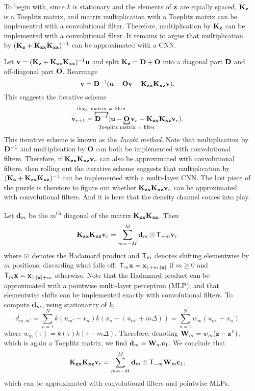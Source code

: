 \documentclass[12pt]{report}
\begin{document}
To begin with, since $k$ is stationary and the elements of $\mathbf{z}$ are equally spaced, $\mathbf{K}_{\mathbf{z}}$ is a Toeplitz matrix, and matrix multiplication with a Toeplitz matrix can be implemented with a convolutional filter.
Therefore, multiplication by $\mathbf{K}_{\mathbf{z}}$ can be implemented with a convolutional filter.
It remains to argue that multiplication by $(\mathbf{K}_{\mathbf{z}} + \mathbf{K}_{\mathbf{z}\mathbf{x}} \mathbf{K}_{\mathbf{x}\mathbf{z}})^{-1}$ can be approximated with a CNN.

Let $\mathbf{v} = (\mathbf{K}_{\mathbf{z}} + \mathbf{K}_{\mathbf{z}\mathbf{x}} \mathbf{K}_{\mathbf{x}\mathbf{z}})^{-1} \mathbf{u}$ and split $\mathbf{K}_{\mathbf{z}} = \mathbf{D} + \mathbf{O}$ into a diagonal part $\mathbf{D}$ and off-diagonal part $\mathbf{O}$.
Rearrange
\begin{equation}
    \mathbf{v} = \mathbf{D}^{-1} (\mathbf{u} - \mathbf{O}\mathbf{v} - \mathbf{K}_{\mathbf{z}\mathbf{x}} \mathbf{K}_{\mathbf{x}\mathbf{z}}\mathbf{v}).
\end{equation}
This suggests the iterative scheme
\begin{equation}
    \vv_{r+1} = \overbracket[1pt]{\mD^{-1}}^{\mathclap{\text{diag.\ matrix $=$ filter}}} (\vu - \underbracket[1pt]{\mO}_{\mathclap{\text{Toeplitz matrix $=$ filter}}} \vv_r - \mK_{\vz\vx} \mK_{\vx\vz}\vv_r).
\end{equation}
This iterative scheme is known as the \emph{Jacobi method}.
Note that multiplication by $\mathbf{D}^{-1}$ and multiplication by $\mathbf{O}$ can both be implemented with convolutional filters.
Therefore, if $\mathbf{K}_{\mathbf{z}\mathbf{x}} \mathbf{K}_{\mathbf{x}\mathbf{z}}\mathbf{v}_r$ can also be approximated with convolutional filters, then rolling out the iterative scheme suggests that multiplication by $(\mathbf{K}_{\mathbf{z}} + \mathbf{K}_{\mathbf{z}\mathbf{x}} \mathbf{K}_{\mathbf{x}\mathbf{z}})^{-1}$ can be implemented with a multi-layer CNN.
The last piece of the puzzle is therefore to figure out whether $\mathbf{K}_{\mathbf{z}\mathbf{x}} \mathbf{K}_{\mathbf{x}\mathbf{z}}\mathbf{v}_r$ can be approximated with convolutional filters.
And it is here that the density channel comes into play.

Let $\mathbf{d}_m$ be the $m$\textsuperscript{th} diagonal of the matrix $\mathbf{K}_{\mathbf{z}\mathbf{x}} \mathbf{K}_{\mathbf{x}\mathbf{z}}$.
Then
\begin{equation}
    \mK_{\vz\vx} \mK_{\vx\vz}\vv_r = \sum_{m=-M}^M \vd_m \had \T_{-m} \vv_r
\end{equation}
where $\odot$ denotes the Hadamard product and $\T_{m}$ denotes shifting elementwise by $m$ positions, discarding what falls off: $\T_{m} \vx = \vx_{1 + m:\abs{\vx}}$ if $m \ge 0$ and $\T_m \vx = \vx_{1 : \abs{\vx} + m}$ otherwise.
Note that the Hadamard product can be approximated with a pointwise multi-layer perceptron (MLP),
and that elementwise shifts can be implemented exactly with convolutional filters.
To compute $\mathbf{d}_m$, using stationarity of $k$,
\begin{equation}
    d_{m, m'}
    = \sum_{n=1}^N k(u_{m'} - x_n) k(x_n - (u_{m'} + m \Delta))
    = \sum_{n=1}^N w_m(u_{m'} - x_n)
\end{equation}
where $w_m(\tau) = k(\tau) k(\tau - m \Delta)$.
Therefore, denoting $\mW_m = w_m(\vz - \vz^\T)$, which is again a Toeplitz matrix, we find
$
    \mathbf{d}_{m} = \mathbf{W}_m \mathbf{c}_1
$.
We conclude that
\begin{equation}
    \mK_{\vz\vx} \mK_{\vx\vz}\vv_r = \sum_{m=-M}^M \vd_m \had \T_{-m} \mW_m \vc_1,
\end{equation}
which can be approximated with convolutional filters and pointwise MLPs.
\end{document}
